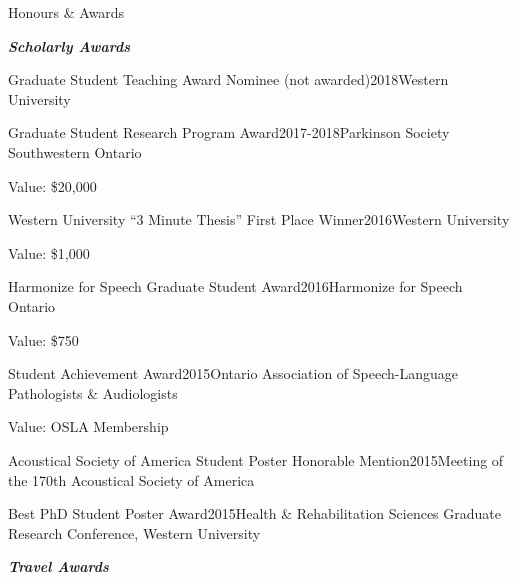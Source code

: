 \documentclass{resume} %
\begin{document}
\begin{rSection}{Honours \& Awards}

\begin{center}
	{\bf \emph{Scholarly Awards}}
\end{center}

\begin{rSubsection}{Graduate Student Teaching Award Nominee (not awarded)}{2018}{Western University}{}
\end{rSubsection}

\begin{rSubsection}{Graduate Student Research Program Award}{2017-2018}{Parkinson Society Southwestern Ontario}{}
	\item Value: \$20,000
\end{rSubsection}

\begin{rSubsection}{Western University ``3 Minute Thesis'' First Place Winner}{2016}{Western University}{}
	\item  Value: \$1,000
\end{rSubsection}

\begin{rSubsection}{Harmonize for Speech Graduate Student Award}{2016}{Harmonize for Speech Ontario}{}
	\item Value: \$750
\end{rSubsection}

\begin{rSubsection}{Student Achievement Award}{2015}{Ontario Association of Speech-Language Pathologists \&
Audiologists}{}
	\item Value: OSLA Membership
\end{rSubsection}

\begin{rSubsection}{Acoustical Society of America Student Poster Honorable Mention}{2015}{Meeting of the 170th Acoustical Society of America}{}
\end{rSubsection}

\begin{rSubsection}{Best PhD Student Poster Award}{2015}{Health \& Rehabilitation Sciences Graduate Research Conference, Western University}{}
\end{rSubsection}

\begin{center}
	{\bf \emph{Travel Awards}}
\end{center}


\end{rSection}
\end{document}
